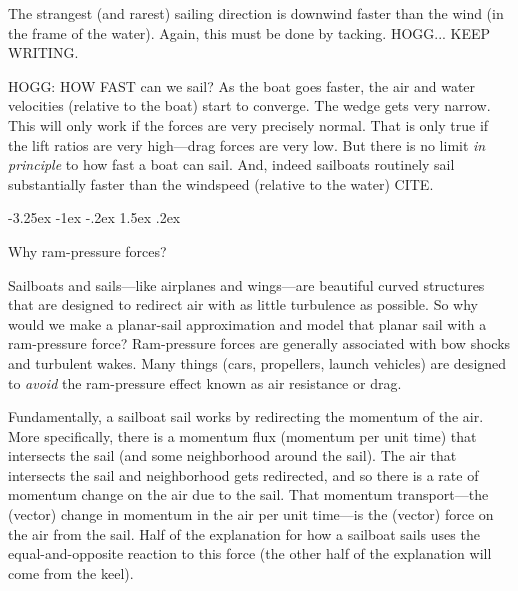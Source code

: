 \documentclass[letterpaper]{article}
\makeatletter
\renewcommand\section{\@startsection {section}{1}{\z@}%
  {-3.25ex \@plus -1ex \@minus -.2ex}%
  {1.5ex \@plus .2ex}%
  {\raggedright\normalfont\large\bfseries}}
\makeatother
\begin{document}
The strangest (and rarest) sailing direction is downwind faster than the wind (in the frame of the water).
Again, this must be done by tacking.
HOGG... KEEP WRITING.

HOGG: HOW FAST can we sail?
As the boat goes faster, the air and water velocities (relative to the boat) start to converge.
The wedge gets very narrow.
This will only work if the forces are very precisely normal.
That is only true if the lift ratios are very high---drag forces are very low.
But there is no limit \emph{in principle} to how fast a boat can sail.
And, indeed sailboats routinely sail substantially faster than the windspeed (relative to the water) CITE.

\section{Why ram-pressure forces?}\label{sec:ram}

Sailboats and sails---like airplanes and wings---are beautiful curved structures that are designed to redirect air with as little turbulence as possible.
So why would we make a planar-sail approximation and model that planar sail with a ram-pressure force?
Ram-pressure forces are generally associated with bow shocks and turbulent wakes.
Many things (cars, propellers, launch vehicles) are designed to \emph{avoid} the ram-pressure effect known as air resistance or drag.

Fundamentally, a sailboat sail works by redirecting the momentum of the air.
More specifically, there is a momentum flux (momentum per unit time) that intersects the sail (and some neighborhood around the sail).
The air that intersects the sail and neighborhood gets redirected, and so there is  a rate of momentum change on the air due to the sail.
That momentum transport---the (vector) change in momentum in the air per unit time---is the (vector) force on the air from the sail.
Half of the explanation for how a sailboat sails uses the equal-and-opposite reaction to this force (the other half of the explanation will come from the keel).
\end{document}
